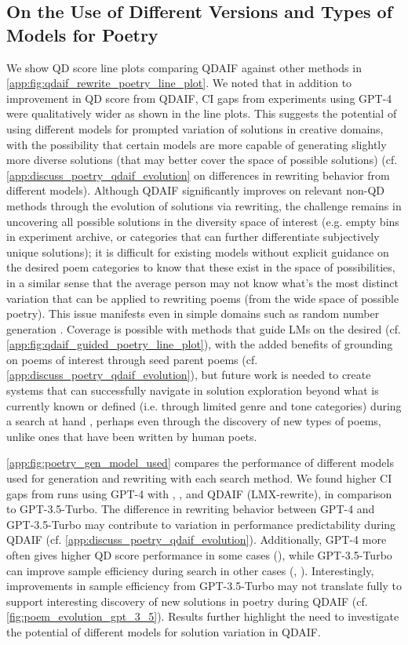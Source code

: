 \subsection{On the Use of Different Versions and Types of Models for Poetry}\label{app:discuss_gpt4_methods}
We show QD score line plots comparing QDAIF against other methods in \cref{app:fig:qdaif_rewrite_poetry_line_plot}. We noted that in addition to improvement in QD score from QDAIF, CI gaps from experiments using GPT-4 were qualitatively wider as shown in the line plots. This suggests the potential of using different models for prompted variation of solutions in creative domains, with the possibility that certain models are more capable of generating slightly more diverse solutions (that may better cover the space of possible solutions) (cf. \cref{app:discuss_poetry_qdaif_evolution} on differences in rewriting behavior from different models). Although QDAIF significantly improves on relevant non-QD methods through the evolution of solutions via rewriting, the challenge remains in uncovering all possible solutions in the diversity space of interest (e.g. empty bins in experiment archive, or categories that can further differentiate subjectively unique solutions); it is difficult for existing models without explicit guidance on the desired poem categories to know that these exist in the space of possibilities, in a similar sense that the average person may not know what's the most distinct variation that can be applied to rewriting poems (from the wide space of possible poetry). This issue manifests even in simple domains such as random number generation \citep{llm_sampling_renda_hopkins_2023}. Coverage is possible with methods that guide LMs on the desired (cf. \cref{app:fig:qdaif_guided_poetry_line_plot}), with the added benefits of grounding on poems of interest through seed parent poems (cf. \cref{app:discuss_poetry_qdaif_evolution}), but future work is needed to create systems that can successfully navigate in solution exploration beyond what is currently known or defined (i.e. through limited genre and tone categories) during a search at hand \citep{zhang2023omni}, perhaps even through the discovery of new types of poems, unlike ones that have been written by human poets.

\cref{app:fig:poetry_gen_model_used} compares the performance of different models used for generation and rewriting with each search method. We found higher CI gaps from runs using GPT-4 with \poembaseone{}, \poemablation{}, and QDAIF (LMX-rewrite), in comparison to GPT-3.5-Turbo. The difference in rewriting behavior between GPT-4 and GPT-3.5-Turbo may contribute to variation in performance predictability during QDAIF (cf. \cref{app:discuss_poetry_qdaif_evolution}). Additionally, GPT-4 more often gives higher QD score performance in some cases (\poembaseone), while GPT-3.5-Turbo can improve sample efficiency during search in other cases (\poemablation, \poembasetwo). Interestingly, improvements in sample efficiency from GPT-3.5-Turbo may not translate fully to support interesting discovery of new solutions in poetry during QDAIF (cf. \cref{fig:poem_evolution_gpt_3_5}). Results further highlight the need to investigate the potential of different models for solution variation in QDAIF.

